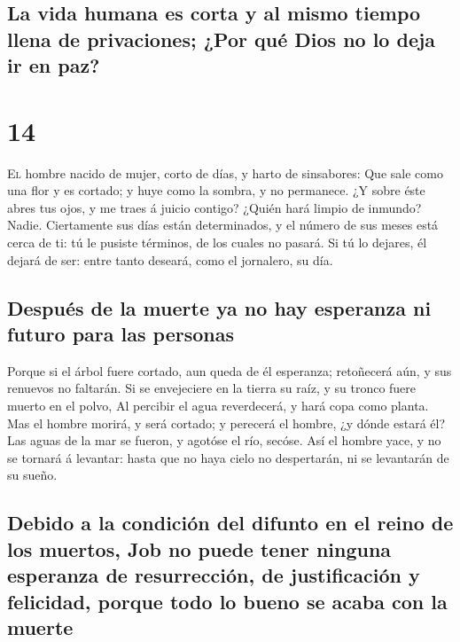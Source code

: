 \hypertarget{la-vida-humana-es-corta-y-al-mismo-tiempo-llena-de-privaciones-por-quuxe9-dios-no-lo-deja-ir-en-paz}{%
\subsection{La vida humana es corta y al mismo tiempo llena de
privaciones; ¿Por qué Dios no lo deja ir en
paz?}\label{la-vida-humana-es-corta-y-al-mismo-tiempo-llena-de-privaciones-por-quuxe9-dios-no-lo-deja-ir-en-paz}}

\hypertarget{section-13}{%
\section{14}\label{section-13}}

 \textsc{El} hombre nacido de mujer, corto de días, y
harto de sinsabores:  Que sale como una flor y es cortado;
y huye como la sombra, y no permanece.  ¿Y sobre éste
abres tus ojos, y me traes á juicio contigo?  ¿Quién hará
limpio de inmundo? Nadie.  Ciertamente sus días están
determinados, y el número de sus meses está cerca de ti: tú le pusiste
términos, de los cuales no pasará.  Si tú lo dejares, él
dejará de ser: entre tanto deseará, como el jornalero, su día.

\hypertarget{despuuxe9s-de-la-muerte-ya-no-hay-esperanza-ni-futuro-para-las-personas}{%
\subsection{Después de la muerte ya no hay esperanza ni futuro para las
personas}\label{despuuxe9s-de-la-muerte-ya-no-hay-esperanza-ni-futuro-para-las-personas}}

 Porque si el árbol fuere cortado, aun queda de él
esperanza; retoñecerá aún, y sus renuevos no faltarán.  Si
se envejeciere en la tierra su raíz, y su tronco fuere muerto en el
polvo,  Al percibir el agua reverdecerá, y hará copa como
planta.  Mas el hombre morirá, y será cortado; y perecerá
el hombre, ¿y dónde estará él?  Las aguas de la mar se
fueron, y agotóse el río, secóse.  Así el hombre yace, y
no se tornará á levantar: hasta que no haya cielo no despertarán, ni se
levantarán de su sueño.

\hypertarget{debido-a-la-condiciuxf3n-del-difunto-en-el-reino-de-los-muertos-job-no-puede-tener-ninguna-esperanza-de-resurrecciuxf3n-de-justificaciuxf3n-y-felicidad-porque-todo-lo-bueno-se-acaba-con-la-muerte}{%
\subsection{Debido a la condición del difunto en el reino de los
muertos, Job no puede tener ninguna esperanza de resurrección, de
justificación y felicidad, porque todo lo bueno se acaba con la
muerte}\label{debido-a-la-condiciuxf3n-del-difunto-en-el-reino-de-los-muertos-job-no-puede-tener-ninguna-esperanza-de-resurrecciuxf3n-de-justificaciuxf3n-y-felicidad-porque-todo-lo-bueno-se-acaba-con-la-muerte}}

